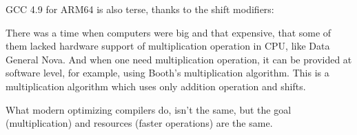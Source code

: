 






GCC 4.9 for ARM64 is also terse, thanks to the shift modifiers:




There was a time when computers were big and that expensive, that some of them lacked hardware support of multiplication
operation in \ac{CPU}, like Data General Nova.
And when one need multiplication operation, it can be provided at software level, for example, using Booth's multiplication
algorithm.
This is a multiplication algorithm which uses only addition operation and shifts.

What modern optimizing compilers do, isn't the same,
but the goal (multiplication) and resources (faster operations) are the same.

